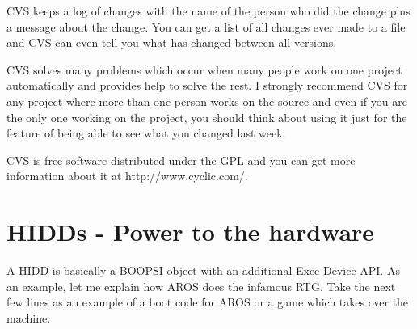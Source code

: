 CVS keeps a log of changes with the name of the person who did the change
plus a message about the change. You can get a list of all changes ever
made to a file and CVS can even tell you what has changed between all
versions.

CVS solves many problems which occur when many people work on one project
automatically and provides help to solve the rest. I strongly recommend CVS
for any project where more than one person works on the source and even if
you are the only one working on the project, you should think about using
it just for the feature of being able to see what you changed last week.

CVS is free software distributed under the GPL and you can get more
information about it at http://www.cyclic.com/.

\section{HIDDs - Power to the hardware}

A HIDD is basically a BOOPSI object with an additional Exec Device API.
As an example, let me explain how AROS does the infamous RTG. Take the
next few lines as an example of a boot code for AROS or a game which
takes over the machine.

